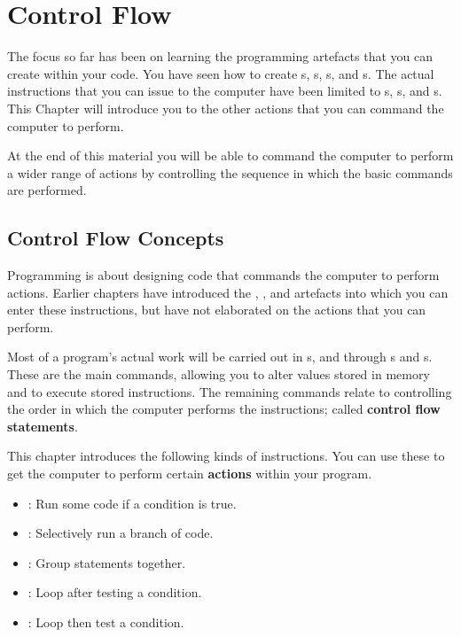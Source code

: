 \chapter{Control Flow} %
\label{cha:control_flow}

The focus so far has been on learning the programming artefacts that you can create within your code. You have seen how to create s, s, s, and s. The actual instructions that you can issue to the computer have been limited to s, s, and s. This Chapter will introduce you to the other actions that you can command the computer to perform.

At the end of this material you will be able to command the computer to perform a wider range of actions by controlling the sequence in which the basic commands are performed.

\minitoc

\clearpage
\section{Control Flow Concepts} %
\label{sec:control_flow_concepts}

Programming is about designing code that commands the computer to perform actions. Earlier chapters have introduced the , , and  artefacts into which you can enter these instructions, but have not elaborated on the actions that you can perform.

Most of a program's actual work will be carried out in s, and through s and s. These are the main commands, allowing you to alter values stored in memory and to execute stored instructions. The remaining commands relate to controlling the order in which the computer performs the instructions; called \textbf{control flow statements}.

This chapter introduces the following kinds of instructions. You can use these to get the computer to perform certain \textbf{actions} within your program.
\begin{itemize}
  \item {}: Run some code if a condition is true.
  \item {}: Selectively run a branch of code.
  \item {}: Group statements together.
  \item {}: Loop after testing a condition.
  \item {}: Loop then test a condition.
\end{itemize}

